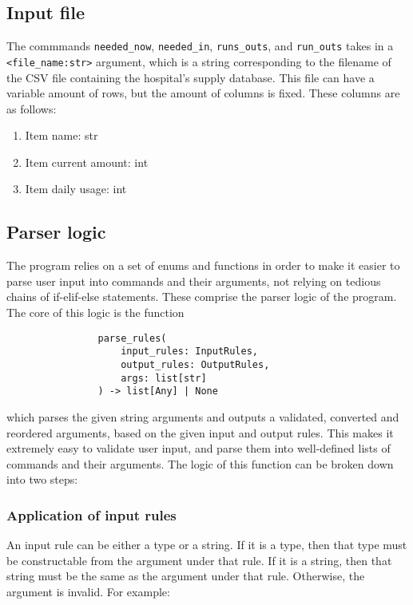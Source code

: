 \documentclass{article}
\begin{document}
		\subsection{Input file}\label{input-file}
			The commmands \verb|needed_now|, \verb|needed_in|, \verb|runs_outs|, and
			\verb|run_outs| takes in a \verb|<file_name:str>| argument, which is a
			string corresponding to the filename of the CSV file containing the hospital's
			supply database. This file can have a variable amount of rows, but the amount of
			columns is fixed. These columns are as follows:

			\begin{enumerate}
				\item Item name: str
				\item Item current amount: int
				\item Item daily usage: int
			\end{enumerate}

		\subsection{Parser logic}\label{parser-logic}
			The program relies on a set of enums and functions in order to make it
			easier to parse user input into commands and their arguments, not relying on tedious
			chains of if-elif-else statements. These comprise the parser logic of the program.
			The core of this logic is the function

			\begin{verbatim}
				parse_rules(
					input_rules: InputRules,
					output_rules: OutputRules,
					args: list[str]
				) -> list[Any] | None
			\end{verbatim}

			which parses the given string arguments and outputs a validated, converted and
			reordered arguments, based on the given input and output rules. This makes it
			extremely easy to validate user input, and parse them into well-defined lists
			of commands and their arguments. The logic of this function can be broken down into
			two steps:

			\subsubsection{Application of input rules}
				An input rule can be either a type or a string. If it is a type, then that type
				must be constructable from the argument under that rule. If it is a string, then
				that string must be the same as the argument under that rule. Otherwise, the
				argument is invalid. For example:
\end{document}
